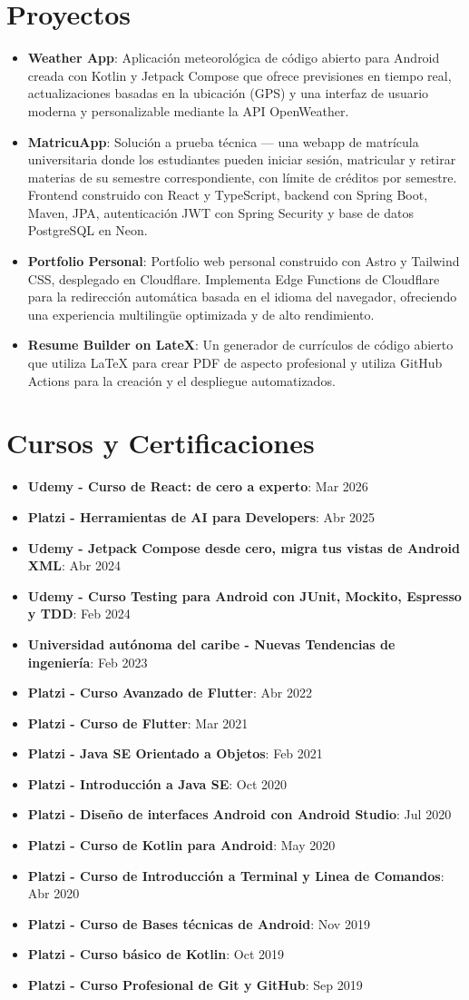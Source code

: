 \documentclass[letterpaper,11pt]{article}
\newcommand{\resumeItem}[2]{
  \item\small{
    \textbf{#1}{: #2 \vspace{-2pt}}
  }
}
\newcommand{\resumeSubItem}[2]{\resumeItem{#1}{#2}\vspace{-4pt}}
\newcommand{\resumeSubHeadingListStart}{\begin{itemize}[leftmargin=*]}
\newcommand{\resumeSubHeadingListEnd}{\end{itemize}}
\begin{document}
\section{Proyectos}
\resumeSubHeadingListStart
\resumeSubItem{Weather App}
{Aplicación meteorológica de código abierto para Android creada con Kotlin y Jetpack Compose que ofrece previsiones en tiempo real, actualizaciones basadas en la ubicación (GPS) y una interfaz de usuario moderna y personalizable mediante la API OpenWeather.}
\resumeSubItem{MatricuApp}
{Solución a prueba técnica — una webapp de matrícula universitaria donde los estudiantes pueden iniciar sesión, matricular y retirar materias de su semestre correspondiente, con límite de créditos por semestre. Frontend construido con React y TypeScript, backend con Spring Boot, Maven, JPA, autenticación JWT con Spring Security y base de datos PostgreSQL en Neon.}
\resumeSubItem{Portfolio Personal}
{Portfolio web personal construido con Astro y Tailwind CSS, desplegado en Cloudflare. Implementa Edge Functions de Cloudflare para la redirección automática basada en el idioma del navegador, ofreciendo una experiencia multilingüe optimizada y de alto rendimiento.}
\resumeSubItem{Resume Builder on LateX}
{Un generador de currículos de código abierto que utiliza LaTeX para crear PDF de aspecto profesional y utiliza GitHub Actions para la creación y el despliegue automatizados.}
\resumeSubHeadingListEnd

\section{Cursos y Certificaciones}
\resumeSubHeadingListStart
\resumeSubItem{Udemy - Curso de React: de cero a experto}{Mar 2026}
\resumeSubItem{Platzi - Herramientas de AI para Developers}{Abr 2025}
\resumeSubItem{Udemy - Jetpack Compose desde cero, migra tus vistas de Android XML}{Abr 2024}
\resumeSubItem{Udemy - Curso Testing para Android con JUnit, Mockito, Espresso y TDD}{Feb 2024}
\resumeSubItem{Universidad autónoma del caribe - Nuevas Tendencias de ingeniería}{Feb 2023}
\resumeSubItem{Platzi - Curso Avanzado de Flutter}{Abr 2022}
\resumeSubItem{Platzi - Curso de Flutter}{Mar 2021}
\resumeSubItem{Platzi - Java SE Orientado a Objetos}{Feb 2021}
\resumeSubItem{Platzi - Introducción a Java SE}{Oct 2020}
\resumeSubItem{Platzi - Diseño de interfaces Android con Android Studio}{Jul 2020}
\resumeSubItem{Platzi - Curso de Kotlin para Android}{May 2020}
\resumeSubItem{Platzi - Curso de Introducción a Terminal y Linea de Comandos}{Abr 2020}
\resumeSubItem{Platzi - Curso de Bases técnicas de Android}{Nov 2019}
\resumeSubItem{Platzi - Curso básico de Kotlin}{Oct 2019}
\resumeSubItem{Platzi - Curso Profesional de Git y GitHub}{Sep 2019}
\resumeSubHeadingListEnd
\end{document}
